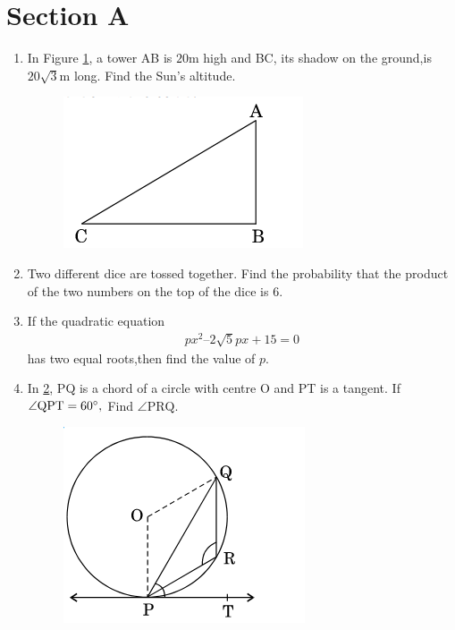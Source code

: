 \documentclass[journal,12pt,twocolumn]{IEEEtran}
\renewcommand\thesection{\arabic{section}}
\begin{document}
\section{Section A}
\renewcommand{\theequation}{\theenumi}
\begin{enumerate}[label=\thesection.\arabic*.,ref=\thesection.\theenumi]
\item In Figure \ref{Figure 1}, a tower AB is $20$m high and BC, its shadow on the ground,is $20\sqrt{3}$m long. Find the Sun’s altitude.
\begin{figure}[h!]
	\centering
    \includegraphics[width=0.8\columnwidth,center]{./figs/image1.png}
	\caption{}
	\label{Figure 1}
\end{figure}
\item Two different dice are tossed together. Find the probability that the product of the two numbers on the top of the dice is $6$.
\item If the quadratic equation
\begin{align} 
px^2 – 2 \sqrt{5} px + 15 = 0
\end{align}
has two equal roots,then find the value of $p$.
\item In \ref{Figure 2}, PQ is a chord of a circle with centre O and PT is a tangent. If $\angle \text{QPT} = 60 \degree,$ Find $\angle \text{PRQ} $.
\begin{figure}[h!]
	\centering
    \includegraphics[width=0.8\columnwidth,center]{./figs/image2.png}
	\caption{}
	\label{Figure 2}
\end{figure}
\end{enumerate}
\end{document}
